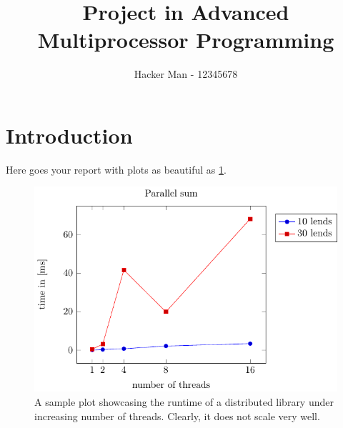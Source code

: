 \documentclass{article}
\begin{document}
\title{Project in Advanced Multiprocessor Programming}
\author{Hacker Man - 12345678}
\maketitle

\section{Introduction}

Here goes your report with plots as beautiful as \cref{fig:example_plot}.

\begin{figure}[ht!]
  \centering
  \includegraphics{../plots/avg_plot.pdf}
  \caption{A sample plot showcasing the runtime of a distributed library under
  increasing number of threads. Clearly, it does not scale very well.}
  \label{fig:example_plot}
\end{figure}
\end{document}
